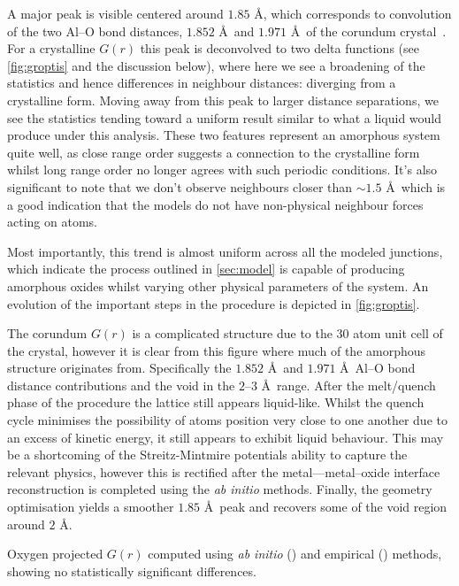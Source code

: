 A major peak is visible centered around $1.85$ \AA, which corresponds to convolution of the two Al--O bond distances, $1.852$ \AA\ and $1.971$ \AA\ of the corundum crystal~\cite{Ishizawa1980}.
For a crystalline $G(r)$ this peak is deconvolved to two delta functions (see \cref{fig:groptis} and the discussion below), where here we see a broadening of the statistics and hence differences in neighbour distances: diverging from a crystalline form.
Moving away from this peak to larger distance separations, we see the statistics tending toward a uniform result similar to what a liquid would produce under this analysis.
These two features represent an amorphous system quite well, as close range order suggests a connection to the crystalline form whilst long range order no longer agrees with such periodic conditions.
It's also significant to note that we don't observe neighbours closer than $\sim\!1.5$ \AA\ which is a good indication that the models do not have non-physical neighbour forces acting on atoms.

Most importantly, this trend is almost uniform across all the modeled junctions, which indicate the process outlined in \cref{sec:model} is capable of producing amorphous oxides whilst varying other physical parameters of the system.
An evolution of the important steps in the procedure is depicted in \cref{fig:groptis}.

The corundum $G(r)$  is a complicated structure due to the 30 atom unit cell of the crystal, however it is clear from this figure where much of the amorphous structure originates from.
Specifically the $1.852$ \AA\ and $1.971$ \AA\ Al--O bond distance contributions and the void in the $2$--$3$ \AA\ range.
After the melt/quench phase of the procedure  the lattice still appears liquid-like.
Whilst the quench cycle minimises the possibility of atoms position very close to one another due to an excess of kinetic energy, it still appears to exhibit liquid behaviour.
This may be a shortcoming of the Streitz-Mintmire potentials ability to capture the relevant physics, however this is rectified after the metal---metal--oxide interface reconstruction is completed  using the \textit{ab initio} methods.
Finally, the geometry optimisation  yields a smoother $1.85$ \AA\ peak and recovers some of the void region around $2$ \AA.

\begin{marginfigure}
\resizebox{\marginparwidth}{!}{}
\caption[Radial Distribution Function Comparison]{\label{fig:grcomp}Oxygen projected $G(r)$ computed using \textit{ab initio} ()  and empirical ()  methods, showing no statistically significant differences.}
\end{marginfigure}

